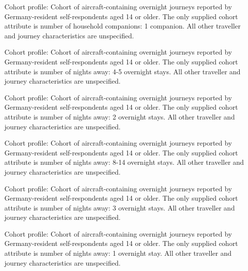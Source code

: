 \begin{promptbox}[title={Number of household companions: 1 companion}]
Cohort profile: Cohort of aircraft-containing overnight journeys reported by Germany-resident self-respondents aged 14 or older. The only supplied cohort attribute is number of household companions: 1 companion. All other traveller and journey characteristics are unspecified.
\end{promptbox}


\begin{promptbox}[title={Number of nights away: 4-5 overnight stays}]
Cohort profile: Cohort of aircraft-containing overnight journeys reported by Germany-resident self-respondents aged 14 or older. The only supplied cohort attribute is number of nights away: 4-5 overnight stays. All other traveller and journey characteristics are unspecified.
\end{promptbox}


\begin{promptbox}[title={Number of nights away: 2 overnight stays}]
Cohort profile: Cohort of aircraft-containing overnight journeys reported by Germany-resident self-respondents aged 14 or older. The only supplied cohort attribute is number of nights away: 2 overnight stays. All other traveller and journey characteristics are unspecified.
\end{promptbox}


\begin{promptbox}[title={Number of nights away: 8-14 overnight stays}]
Cohort profile: Cohort of aircraft-containing overnight journeys reported by Germany-resident self-respondents aged 14 or older. The only supplied cohort attribute is number of nights away: 8-14 overnight stays. All other traveller and journey characteristics are unspecified.
\end{promptbox}


\begin{promptbox}[title={Number of nights away: 3 overnight stays}]
Cohort profile: Cohort of aircraft-containing overnight journeys reported by Germany-resident self-respondents aged 14 or older. The only supplied cohort attribute is number of nights away: 3 overnight stays. All other traveller and journey characteristics are unspecified.
\end{promptbox}


\begin{promptbox}[title={Number of nights away: 1 overnight stay}]
Cohort profile: Cohort of aircraft-containing overnight journeys reported by Germany-resident self-respondents aged 14 or older. The only supplied cohort attribute is number of nights away: 1 overnight stay. All other traveller and journey characteristics are unspecified.
\end{promptbox}


